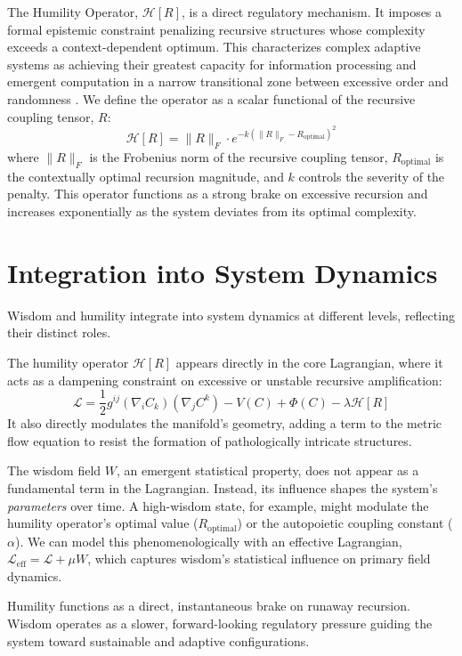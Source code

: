 The Humility Operator, \(\mathcal{H}[R]\), is a direct regulatory mechanism. It imposes a formal epistemic constraint penalizing recursive structures whose complexity exceeds a context-dependent optimum. This characterizes complex adaptive systems as achieving their greatest capacity for information processing and emergent computation in a narrow transitional zone between excessive order and randomness \autocite{Langton1990}. We define the operator as a scalar functional of the recursive coupling tensor, \(R\):
\begin{equation}
\mathcal{H}[R] = \|R\|_F \cdot e^{-k(\|R\|_F - R_{\text{optimal}})^2}
\end{equation}
where \(\|R\|_F\) is the Frobenius norm of the recursive coupling tensor, \(R_{\text{optimal}}\) is the contextually optimal recursion magnitude, and \(k\) controls the severity of the penalty. This operator functions as a strong brake on excessive recursion and increases exponentially as the system deviates from its optimal complexity.


\section{Integration into System Dynamics}
\label{sec:integration_into_system_dynamics}

Wisdom and humility integrate into system dynamics at different levels, reflecting their distinct roles.

The humility operator \(\mathcal{H}[R]\) appears directly in the core Lagrangian, where it acts as a dampening constraint on excessive or unstable recursive amplification:
\begin{equation}
\mathcal{L} = \frac{1}{2} g^{ij} (\nabla_i C_k)(\nabla_j C^k) - V(C) + \Phi(C) - \lambda \mathcal{H}[R]
\end{equation}
It also directly modulates the manifold's geometry, adding a term to the metric flow equation to resist the formation of pathologically intricate structures.

The wisdom field \(W\), an emergent statistical property, does not appear as a fundamental term in the Lagrangian. Instead, its influence shapes the system's \textit{parameters} over time. A high-wisdom state, for example, might modulate the humility operator's optimal value (\(R_{\text{optimal}}\)) or the autopoietic coupling constant (\(\alpha\)). We can model this phenomenologically with an effective Lagrangian, \(\mathcal{L}_{\text{eff}} = \mathcal{L} + \mu W\), which captures wisdom's statistical influence on primary field dynamics.

Humility functions as a direct, instantaneous brake on runaway recursion. Wisdom operates as a slower, forward-looking regulatory pressure guiding the system toward sustainable and adaptive configurations.